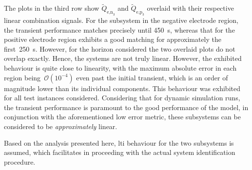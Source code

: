 The   plots   in  the   third   row   show  $\widetilde{Q}_{\text{e,n}_3}$   and
$\widetilde{Q}_{\text{e,p}_3}$ overlaid with their respective linear combination
signals. For the  subsystem in the  negative electrode  region, the transient
performance matches  precisely until \approx\SI{450}{\second}, whereas that for
the positive electrode region exhibits a good matching for approximately the
first~\SI{250}{\second}.  However,  for  the  horizon  considered  the  two
overlaid plots do not overlap exactly.  Hence, the systems are not truly linear.
However,  the  exhibited  behaviour  is  quite  close  to  linearity,  with  the
maximum  absolute error  in each  region being~$\mathcal{O}(10^{-4})$  even past
the initial  transient, which is an order of magnitude lower than its individual
components.  This behaviour  was exhibited  for all  test instances considered.
Considering  that for  dynamic  simulation runs,  the  transient performance  is
paramount  to  the good  performance  of  the  model,  in conjunction  with  the
aforementioned  low error  metric,  these  subsystems can be  considered to  be
\emph{approximately} linear.

Based  on  the  analysis  presented   here,  \gls{lti}  behaviour  for  the  two
subsystems is  assumed, which facilitates  in proceeding with the  actual system
identification procedure.


